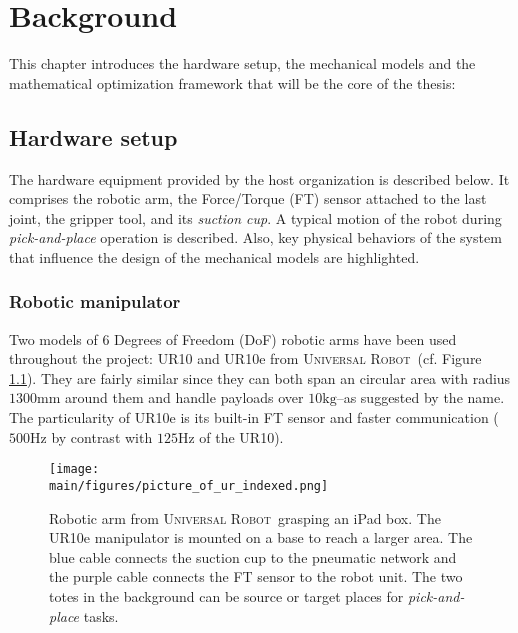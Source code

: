 \documentclass[/home/francois/latex/report/main.tex]{subfiles}
\begin{document}
\chapter{Background}
\label{chapter:background}

This chapter introduces the hardware setup, the mechanical models and the mathematical optimization framework that will be the core of the thesis:

\section{Hardware setup}
\label{section:hardware}

The hardware equipment provided by the host organization is described below. It comprises the robotic arm, the Force/Torque (FT) sensor attached to the last joint, the gripper tool, and its \textit{suction cup}. A typical motion of the robot during \textit{pick-and-place} operation is described. Also, key physical behaviors of the system that influence the design of the mechanical models are highlighted.

\subsection{Robotic manipulator}

Two models of 6 Degrees of Freedom (DoF) robotic arms have been used throughout the project: UR10 and UR10e from \textsc{Universal Robot}\texttrademark \ (cf. Figure \ref{fig:background:stanislaw}). They are fairly similar since they can both span an circular area with radius $1300 \si{\milli\meter}$ around them and handle payloads over $10 \si{\kilo\gram}$–as suggested by the name. The particularity of UR10e is its built-in \ac{FT} sensor and faster communication ($500 \si{\hertz}$ by contrast with $125 \si{\hertz}$ of the UR10).

\begin{figure}[h]
  \centering
  \texttt{[image: \\main/figures/picture\_of\_ur\_indexed.png]}
  \caption{Robotic arm from \textsc{Universal Robot}\texttrademark \ grasping an iPad box. The UR10e manipulator is mounted on a base to reach a larger area. The blue cable connects the suction cup to the pneumatic network and the purple cable connects the \ac{FT} sensor to the robot unit. The two totes in the background can be source or target places for \textit{pick-and-place} tasks.}
  \label{fig:background:stanislaw}
\end{figure}
\end{document}
